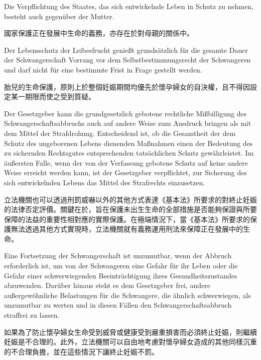 \documentclass[12pt]{article}
\begin{document}
\syncleft
\begin{sourcepara}
Die Verpflichtung des Staates, das sich entwickelnde Leben in Schutz zu nehmen, besteht auch gegenüber der Mutter.
\end{sourcepara}
\begin{transpara}
國家保護正在發展中生命的義務，亦存在於對母親的關係中。
\end{transpara}

\syncleft
\begin{sourcepara}
Der Lebensschutz der Leibesfrucht genießt grundsätzlich für die gesamte Dauer der Schwangerschaft Vorrang vor dem Selbstbestimmungsrecht der Schwangeren und darf nicht für eine bestimmte Frist in Frage gestellt werden.
\end{sourcepara}
\begin{transpara}
胎兒的生命保護，原則上於整個妊娠期間均優先於懷孕婦女的自決權，且不得因設定某一期限而使之受到質疑。
\end{transpara}

\syncleft
\begin{sourcepara}
Der Gesetzgeber kann die grundgesetzlich gebotene rechtliche Mißbilligung des Schwangerschaftsabbruchs auch auf andere Weise zum Ausdruck bringen als mit dem Mittel der Strafdrohung. Entscheidend ist, ob die Gesamtheit der dem Schutz des ungeborenen Lebens dienenden Maßnahmen einen der Bedeutung des zu sichernden Rechtsgutes entsprechenden tatsächlichen Schutz gewährleistet. Im äußersten Falle, wenn der von der Verfassung gebotene Schutz auf keine andere Weise erreicht werden kann, ist der Gesetzgeber verpflichtet, zur Sicherung des sich entwickelnden Lebens das Mittel des Strafrechts einzusetzen.
\end{sourcepara}
\begin{transpara}
立法機關也可以透過刑罰威嚇以外的其他方式表達《基本法》所要求的對終止妊娠的法律否定評價。關鍵在於，旨在保護未出生生命的全部措施是否能夠保證與所要保障的法益的重要性相對應的實際保護。在極端情況下，當《基本法》所要求的保護無法透過其他方式實現時，立法機關就有義務運用刑法來保障正在發展中的生命。
\end{transpara}

\syncleft
\begin{sourcepara}
Eine Fortsetzung der Schwangerschaft ist unzumutbar, wenn der Abbruch erforderlich ist, um von der Schwangeren eine Gefahr für ihr Leben oder die Gefahr einer schwerwiegenden Beeinträchtigung ihres Gesundheitszustandes abzuwenden. Darüber hinaus steht es dem Gesetzgeber frei, andere außergewöhnliche Belastungen für die Schwangere, die ähnlich schwerwiegen, als unzumutbar zu werten und in diesen Fällen den Schwangerschaftsabbruch straffrei zu lassen.
\end{sourcepara}
\begin{transpara}
如果為了防止懷孕婦女生命受到威脅或健康受到嚴重損害而必須終止妊娠，則繼續妊娠是不合理的。此外，立法機關可以自由地考慮對懷孕婦女造成的其他同樣沉重的不合理負擔，並在這些情況下讓終止妊娠不罰。
\end{transpara}
\end{document}
